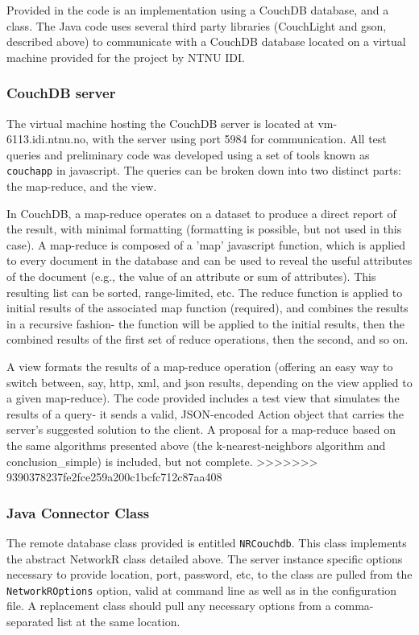 Provided in the code is an implementation using a CouchDB database, and a class. The Java code uses several third party libraries (CouchLight and gson, described above) to communicate with a CouchDB database located on a virtual machine provided for the project by NTNU IDI.

\subsubsection{CouchDB server}
The virtual machine hosting the CouchDB server is located at vm-6113.idi.ntnu.no, with the server using port 5984 for communication. All test queries and preliminary code was developed using a set of tools known as \texttt{couchapp} in javascript. The queries can be broken down into two distinct parts: the map-reduce, and the view. 

In CouchDB, a map-reduce operates on a dataset to produce a direct report of the result, with minimal formatting (formatting is possible, but not used in this case). A  map-reduce is composed of a 'map' javascript function, which is applied to every document in the database and can be used to reveal the useful attributes of the document (e.g., the value of an attribute or sum of attributes). This resulting list can be sorted, range-limited, etc. The reduce function is applied to initial results of the associated map function (required), and combines the results in a recursive fashion- the function will be applied to the initial results, then the combined results of the first set of reduce operations, then the second, and so on. 

A view formats the results of a map-reduce operation (offering an easy way to switch between, say, http, xml, and json results, depending on the view applied to a given map-reduce).
The code provided includes a test view that simulates the results of a query- it sends a valid, JSON-encoded Action object that carries the server's suggested solution to the client. A proposal for a map-reduce based on the same algorithms presented above (the k-nearest-neighbors algorithm and conclusion\_simple) is included, but not complete.
>>>>>>> 9390378237fe2fce259a200c1bcfc712c87aa408

\subsubsection{Java Connector Class}
The remote database class provided is entitled \texttt{NRCouchdb}. This class implements the abstract NetworkR class detailed above. The server instance specific options necessary to provide location, port, password, etc, to the class are pulled from the \texttt{NetworkROptions} option, valid at command line as well as in the configuration file. A replacement class should pull any necessary options from a comma-separated list at the same location.

